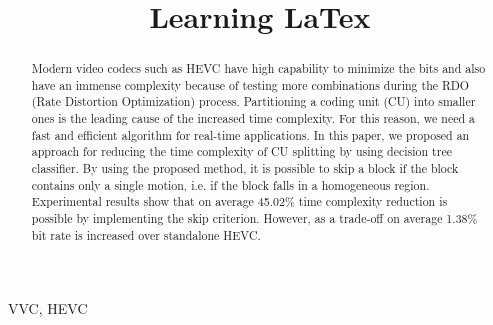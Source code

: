 \documentclass{article}
\begin{document}
\sloppy
	
	\def\x{{\mathbf x}}
	\def\L{{\cal L}}
	
	
	\title{Learning LaTex}
	
	
	\address{$^{\#}$Rajshahi University of Engineering \& Technology, Rajshahi,  Bangladesh}
	
	\maketitle
	
	\begin{abstract}
	Modern video codecs such as HEVC have high capability to minimize the bits and also have an immense complexity because of testing more combinations during the RDO (Rate Distortion Optimization) process. Partitioning a coding unit (CU) into smaller ones is the leading cause of the increased time complexity. For this reason, we need a fast and efficient algorithm for real-time applications. In this paper, we proposed an approach for reducing the time complexity of CU splitting by using decision tree classifier. By using the proposed method, it is possible to skip a block if the block contains only a single motion, i.e. if the block falls in a homogeneous region. Experimental results show that on average 45.02\% time complexity reduction is possible by implementing the skip criterion. However, as a trade-off on average 1.38\% bit rate is increased over standalone HEVC.
	\end{abstract}	
	\begin{keywords}
		VVC, HEVC
	\end{keywords}

	
	
	
\end{document}

